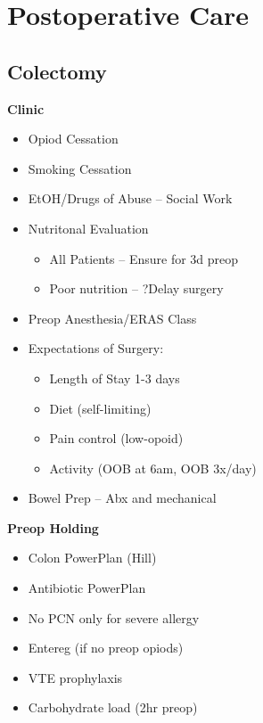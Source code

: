 \documentclass[
]{book}
\providecommand{\tightlist}{%
  \setlength{\itemsep}{0pt}\setlength{\parskip}{0pt}}
\begin{document}
\hypertarget{part-postoperative-care}{%
\part*{Postoperative Care}\label{part-postoperative-care}}

\hypertarget{colectomy}{%
\chapter{Colectomy}\label{colectomy}}

\textbf{Clinic}

\begin{itemize}
\tightlist
\item
  Opiod Cessation
\item
  Smoking Cessation
\item
  EtOH/Drugs of Abuse -- Social Work
\item
  Nutritonal Evaluation

  \begin{itemize}
  \tightlist
  \item
    All Patients -- Ensure for 3d preop
  \item
    Poor nutrition -- ?Delay surgery
  \end{itemize}
\item
  Preop Anesthesia/ERAS Class
\item
  Expectations of Surgery:

  \begin{itemize}
  \tightlist
  \item
    Length of Stay 1-3 days
  \item
    Diet (self-limiting)
  \item
    Pain control (low-opoid)
  \item
    Activity (OOB at 6am, OOB 3x/day)
  \end{itemize}
\item
  Bowel Prep -- Abx and mechanical
\end{itemize}

\textbf{Preop Holding}

\begin{itemize}
\tightlist
\item
  Colon PowerPlan (Hill)
\item
  Antibiotic PowerPlan
\item
  No PCN only for severe allergy
\item
  Entereg (if no preop opiods)
\item
  VTE prophylaxis
\item
  Carbohydrate load (2hr preop)
\end{itemize}
\end{document}
